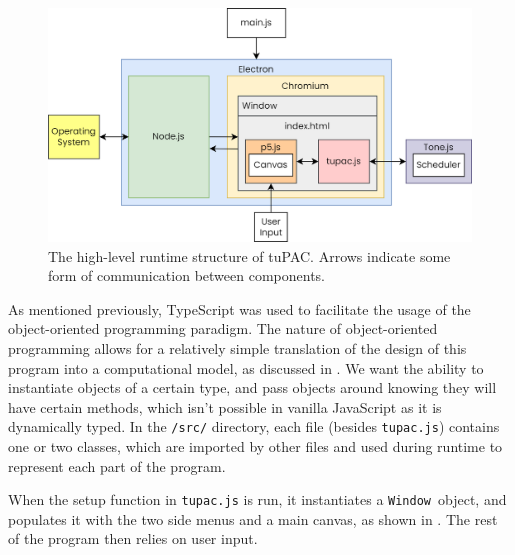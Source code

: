 \documentclass[12pt,a4paper,oneside,openright]{report}
\newcommand{\window}{\texttt{Window}}
\begin{document}
\begin{figure}[h]
    \centering
    \includegraphics[scale=0.35]{images/tuPAC_structure.png}
    \caption{The high-level runtime structure of tuPAC. Arrows indicate some form of communication between components.}
    \label{fig:tupac_structure}
\end{figure}

As mentioned previously, TypeScript was used to facilitate the usage of the object-oriented programming paradigm. The nature of object-oriented programming allows for a relatively simple translation of the design of this program into a computational model, as discussed in . We want the ability to instantiate objects of a certain type, and pass objects around knowing they will have certain methods, which isn't possible in vanilla JavaScript as it is dynamically typed. In the \verb|/src/| directory, each file (besides \verb|tupac.js|) contains one or two classes, which are imported by other files and used during runtime to represent each part of the program.

When the setup function in \verb|tupac.js| is run, it instantiates a \window\ object, and populates it with the two side menus and a main canvas, as shown in . The rest of the program then relies on user input.
\end{document}
